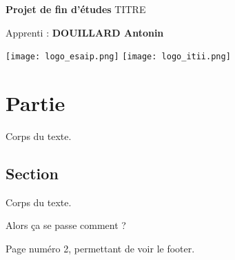 \documentclass[a4paper,french,11pt]{report}
\begin{document}

\begin{titlepage}

\thispagestyle{first}

\begin{center}
\Huge{\textbf{Projet de fin d'études}}
\vspace{0.5cm}
\LARGE{TITRE}
           
\vspace{1.5cm}
Apprenti : \textbf{DOUILLARD Antonin}
           
\texttt{[image: logo\_esaip.png]}
\texttt{[image: logo\_itii.png]}
           
\end{center}

\end{titlepage}


\tableofcontents



\chapter{Partie}

Corps du texte.

\section{Section}

Corps du texte.

Alors ça se passe comment ?

\newpage

Page numéro 2, permettant de voir le footer.

\end{document}
